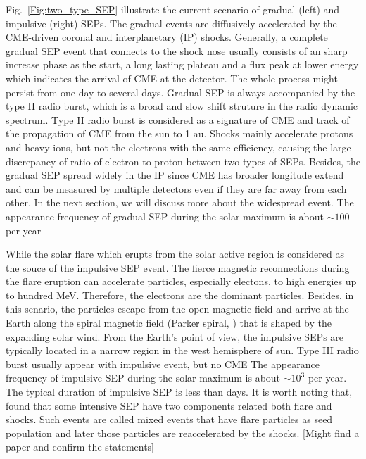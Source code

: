 Fig.~\ref{Fig:two_type_SEP} illustrate the current scenario of gradual (left) and impulsive (right) \acp{SEP}.
The gradual events are diffusively accelerated by the CME-driven coronal and interplanetary (IP) shocks. Generally, a complete gradual \ac{SEP} event that connects to the shock nose usually consists of an sharp increase phase as the start, a long lasting plateau and a flux peak at lower energy which indicates the arrival of \ac{CME} at the detector. The whole process might persist from one day to several days. Gradual \ac{SEP} is always accompanied by the type II radio burst, which is a broad and slow shift struture in the radio dynamic spectrum. Type II radio burst is considered as a signature of \ac{CME} and track of the propagation of \ac{CME} from the sun to 1 au. Shocks mainly accelerate protons and heavy ions, but not the electrons with the same efficiency, causing the large discrepancy of ratio of electron to proton between two types of \acp{SEP}.
Besides, the gradual \ac{SEP} spread widely in the IP since \ac{CME} has broader longitude extend and can be measured by multiple detectors even if they are far away from each other. In the next section, we will discuss more about the widespread event. The appearance frequency of gradual \ac{SEP} during the solar maximum is about $\sim 100$ per year

While the solar flare which erupts from the solar active region is considered as the souce of the impulsive \ac{SEP} event. The fierce magnetic reconnections during the flare eruption can accelerate particles, especially electons, to high energies up to hundred MeV. Therefore, the electrons are the dominant particles. Besides, in this senario, the particles escape from the open magnetic field and arrive at the Earth along the spiral magnetic field (Parker spiral, \citep{Parker-1958}) that is shaped by the expanding solar wind. From the Earth's point of view, the impulsive \acp{SEP} are typically located in a narrow region in the west hemisphere of sun. Type III radio burst usually appear with impulsive event, but no \ac{CME}
The appearance frequency of impulsive \ac{SEP} during the solar maximum is about $\sim 10^3$ per year. The typical duration of impulsive \ac{SEP} is less than days.
It is worth noting that, \citep{cane2003two} found that some intensive \ac{SEP} have two components related both flare and shocks. Such events are called mixed events that have flare particles as seed population and later those particles are reaccelerated by the shocks. [Might find a paper and confirm the statements]

